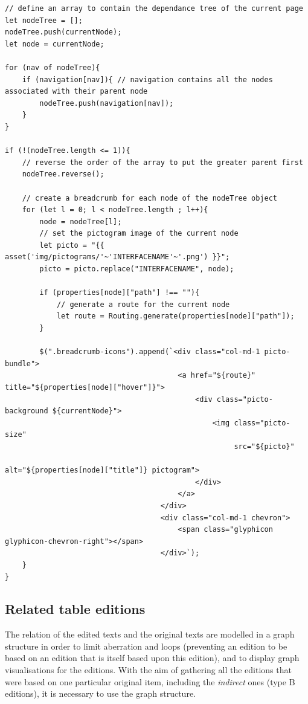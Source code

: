 \documentclass[a4paper,12pt,twoside]{book}
\begin{document}
\begin{lstlisting}
// define an array to contain the dependance tree of the current page
let nodeTree = [];
nodeTree.push(currentNode);
let node = currentNode;

for (nav of nodeTree){
    if (navigation[nav]){ // navigation contains all the nodes associated with their parent node
        nodeTree.push(navigation[nav]);
    }
}

if (!(nodeTree.length <= 1)){
    // reverse the order of the array to put the greater parent first
    nodeTree.reverse();

    // create a breadcrumb for each node of the nodeTree object
    for (let l = 0; l < nodeTree.length ; l++){
        node = nodeTree[l];
        // set the pictogram image of the current node
        let picto = "{{ asset('img/pictograms/'~'INTERFACENAME'~'.png') }}";
        picto = picto.replace("INTERFACENAME", node);

        if (properties[node]["path"] !== ""){
            // generate a route for the current node
            let route = Routing.generate(properties[node]["path"]);
        }

        $(".breadcrumb-icons").append(`<div class="col-md-1 picto-bundle">
                                        <a href="${route}" title="${properties[node]["hover"]}">
                                            <div class="picto-background ${currentNode}">
                                                <img class="picto-size"
                                                     src="${picto}"
                                                     alt="${properties[node]["title"]} pictogram">
                                            </div>
                                        </a>
                                    </div>
                                    <div class="col-md-1 chevron">
                                        <span class="glyphicon glyphicon-chevron-right"></span>
                                    </div>`);
    }
}
\end{lstlisting}

			\subsection{Related table editions}\label{related-table-editions}

The relation of the edited texts and the original texts are modelled in a graph structure in order to limit aberration and loops (preventing an edition to be based on an edition that is itself based upon this edition), and to display graph visualisations for the editions. With the aim of gathering all the editions that were based on one particular original item, including the \emph{indirect} ones (type B editions), it is necessary to use the graph structure.
\end{document}
